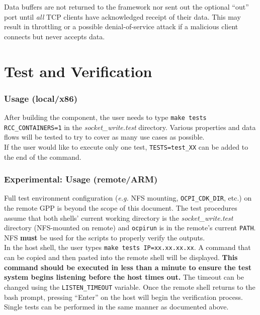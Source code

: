 \documentclass{article}
\begin{document}
Data buffers are not returned to the framework nor sent out the optional ``out'' port until \textit{all} TCP clients have acknowledged receipt of their data.
This may result in throttling or a possible denial-of-service attack if a malicious client connects but never accepts data.

\section*{Test and Verification}

\subsubsection*{Usage (local/x86)}
After building the component, the user needs to type \verb+make tests RCC_CONTAINERS=1+ in the \textit{socket\_write.test} directory. Various properties and data flows will be tested to try to cover as many use cases as possible. \\

If the user would like to execute only one test, \verb+TESTS=test_XX+ can be added to the end of the command.

\subsubsection*{\textbf{Experimental}: Usage (remote/ARM)}
Full test environment configuration (\textit{e.g.} NFS mounting, \verb+OCPI_CDK_DIR+, etc.) on the remote GPP is beyond the scope of this document. The test procedures assume that both shells' current working directory is the \textit{socket\_write.test} directory (NFS-mounted on remote) and \verb+ocpirun+ is in the remote's current \verb+PATH+. NFS \textbf{must} be used for the scripts to properly verify the outputs. \\

In the host shell, the user types \verb+make tests IP=xx.xx.xx.xx+. A command that can be copied and then pasted into the remote shell will be displayed. \textbf{This command should be executed in less than a minute to ensure the test system begins listening before the host times out.} The timeout can be changed using the \verb+LISTEN_TIMEOUT+ variable. Once the remote shell returns to the bash prompt, pressing ``Enter'' on the host will begin the verification process. \\

Single tests can be performed in the same manner as documented above.
\end{document}
